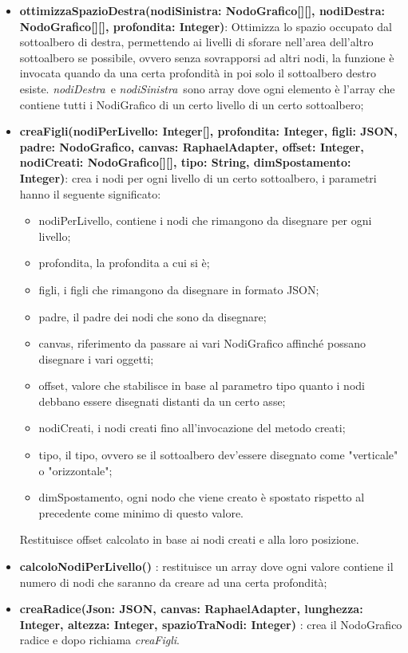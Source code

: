 \begin{itemize}
\item \textbf{ottimizzaSpazioDestra(nodiSinistra: NodoGrafico[][], nodiDestra: NodoGrafico[][], profondita: Integer)}: Ottimizza lo spazio occupato dal sottoalbero di destra, permettendo ai livelli di sforare nell'area dell'altro sottoalbero se possibile, ovvero senza sovrapporsi ad altri nodi, la funzione è invocata quando da una certa profondità in poi solo il sottoalbero destro esiste. \textit{nodiDestra}\ e  \textit{nodiSinistra}\ sono array dove ogni elemento è l'array che contiene tutti i NodiGrafico di un certo livello di un certo sottoalbero;
\item \textbf{creaFigli(nodiPerLivello: Integer[], profondita: Integer, figli: JSON, padre: NodoGrafico, canvas: RaphaelAdapter, offset: Integer, nodiCreati: NodoGrafico[][], tipo: String, dimSpostamento: Integer)}: crea i nodi per ogni livello di un certo sottoalbero, i parametri hanno il seguente significato:
\begin{itemize}
\item nodiPerLivello, contiene i nodi che rimangono da disegnare per ogni livello;
\item profondita, la profondita a cui si è;
\item figli, i figli che rimangono da disegnare in formato JSON;
\item padre, il padre dei nodi che sono da disegnare;
\item canvas, riferimento da passare ai vari NodiGrafico affinché possano disegnare i vari oggetti;
\item offset, valore che stabilisce in base al parametro tipo quanto i nodi debbano essere disegnati distanti da un certo asse;
\item nodiCreati, i nodi creati fino all'invocazione del metodo creati;
\item tipo, il tipo, ovvero se il sottoalbero dev'essere disegnato come "verticale" o "orizzontale";
\item dimSpostamento, ogni nodo che viene creato è spostato rispetto al precedente come minimo di questo valore.
\end{itemize}
Restituisce offset calcolato in base ai nodi creati e alla loro posizione.
\item \textbf{calcoloNodiPerLivello()} : restituisce un array dove ogni valore contiene il numero di nodi che saranno da creare ad una certa profondità;
\item \textbf{creaRadice(Json: JSON, canvas: RaphaelAdapter, lunghezza: Integer, altezza: Integer, spazioTraNodi: Integer)} : crea il NodoGrafico radice e dopo richiama \textit{creaFigli}.
\end{itemize}

